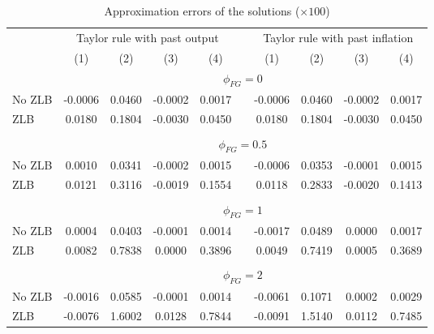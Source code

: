 \begin{table}[H]
	\centering
	\caption{Approximation errors of the solutions ($\times 100$)}\label{tab:app_error}%
	\begin{tabular}{lccccrlccc}
    \toprule
          & \multicolumn{4}{c}{Taylor rule with past output} &       & \multicolumn{4}{c}{Taylor rule with past inflation} \\
    \cline{2-10}
          & (1)   & (2)   & (3)   & (4)   &       & \multicolumn{1}{c}{(1)} & (2)   & (3)   & (4) \\
    \midrule      
          & \multicolumn{9}{c}{$\phi_{FG}=0$} \\
	\midrule          
    No ZLB & -0.0006 & 0.0460 & -0.0002 & 0.0017 &       & \multicolumn{1}{c}{-0.0006} & 0.0460 & -0.0002 & 0.0017 \\
    ZLB   & 0.0180 & 0.1804 & -0.0030 & 0.0450 &       & \multicolumn{1}{c}{0.0180} & 0.1804 & -0.0030 & 0.0450 \\
          &       &       &       &       &       &       &       &       &  \\
	\midrule          
          & \multicolumn{9}{c}{$\phi_{FG}=0.5$} \\
	\midrule          
    No ZLB & 0.0010 & 0.0341 & -0.0002 & 0.0015 &       & \multicolumn{1}{c}{-0.0006} & 0.0353 & -0.0001 & 0.0015 \\
    ZLB   & 0.0121 & 0.3116 & -0.0019 & 0.1554 &       & \multicolumn{1}{c}{0.0118} & 0.2833 & -0.0020 & 0.1413 \\
          &       &       &       &       &       &       &       &       &  \\
	\midrule          
          & \multicolumn{9}{c}{$\phi_{FG}=1$} \\
	\midrule          
    No ZLB & 0.0004 & 0.0403 & -0.0001 & 0.0014 &       & \multicolumn{1}{c}{-0.0017} & 0.0489 & 0.0000 & 0.0017 \\
    ZLB   & 0.0082 & 0.7838 & 0.0000 & 0.3896 &       & \multicolumn{1}{c}{0.0049} & 0.7419 & 0.0005 & 0.3689 \\
          &       &       &       &       &       &       &       &       &  \\
	\midrule          
          & \multicolumn{9}{c}{$\phi_{FG}=2$} \\
    \midrule      
    No ZLB & -0.0016 & 0.0585 & -0.0001 & 0.0014 &       & \multicolumn{1}{c}{-0.0061} & 0.1071 & 0.0002 & 0.0029 \\
    ZLB   & -0.0076 & 1.6002 & 0.0128 & 0.7844 &       & \multicolumn{1}{c}{-0.0091} & 1.5140 & 0.0112 & 0.7485 \\

\end{tabular}
\end{table}
